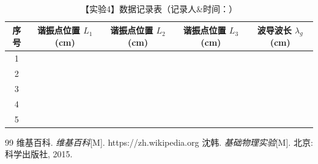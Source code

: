 \begin{table}[h!]
	\centering
	\caption{【实验4】数据记录表（记录人\&时间：\hspace{4cm}）}
	\renewcommand{\arraystretch}{1.5}
	\begin{tabular}{|c|c|c|c|c|}
		\hline
		\textbf{序号} & \textbf{谐振点位置 $L_1$ (cm)} & \textbf{谐振点位置 $L_2$ (cm)} & \textbf{谐振点位置 $L_3$ (cm)} & \textbf{波导波长 $\lambda_g$ (cm)} \\ \hline
		1 & \hspace{3cm} & \hspace{3cm} & \hspace{3cm} & \hspace{3cm} \\ \hline
		2 & \hspace{3cm} & \hspace{3cm} & \hspace{3cm} & \hspace{3cm} \\ \hline
		3 & \hspace{3cm} & \hspace{3cm} & \hspace{3cm} & \hspace{3cm} \\ \hline
		4 & \hspace{3cm} & \hspace{3cm} & \hspace{3cm} & \hspace{3cm} \\ \hline
		5 & \hspace{3cm} & \hspace{3cm} & \hspace{3cm} & \hspace{3cm} \\ \hline
	\end{tabular}
\end{table}

\renewcommand{\refname}{Reference}
\begin{thebibliography}{99}	
	 维基百科. \emph{维基百科}[M]. https://zh.wikipedia.org
	 沈韩. \emph{基础物理实验}[M]. 北京: 科学出版社, 2015.	
\end{thebibliography}